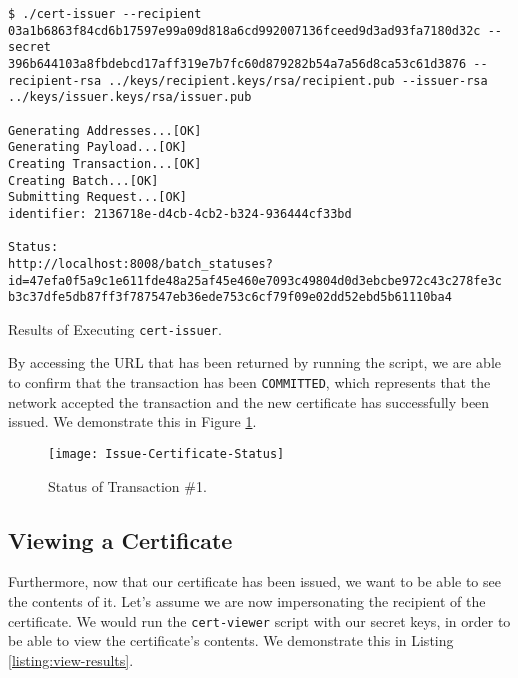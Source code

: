 \begin{listing}[ht]
	\begin{verbatim}
$ ./cert-issuer --recipient 03a1b6863f84cd6b17597e99a09d818a6cd992007136fceed9d3ad93fa7180d32c --secret 396b644103a8fbdebcd17aff319e7b7fc60d879282b54a7a56d8ca53c61d3876 --recipient-rsa ../keys/recipient.keys/rsa/recipient.pub --issuer-rsa ../keys/issuer.keys/rsa/issuer.pub

Generating Addresses...[OK]
Generating Payload...[OK]
Creating Transaction...[OK]
Creating Batch...[OK]
Submitting Request...[OK]
identifier: 2136718e-d4cb-4cb2-b324-936444cf33bd

Status:
http://localhost:8008/batch_statuses?id=47efa0f5a9c1e611fde48a25af45e460e7093c49804d0d3ebcbe972c43c278fe3c
b3c37dfe5db87ff3f787547eb36ede753c6cf79f09e02dd52ebd5b61110ba4

\end{verbatim}
	\caption{Results of Executing \texttt{cert-issuer}.}
	\label{listing:issue-results}
\end{listing}

By accessing the URL that has been returned by running the script, we are able to confirm that the transaction has been \texttt{COMMITTED}, which represents that the network accepted the transaction and the new certificate has successfully been issued. We demonstrate this in Figure \ref{fig:issue-certificate-status}.

\begin{figure}[htb]
	\centering
	\texttt{[image: Issue-Certificate-Status]}
	\caption{Status of Transaction \#1.}
	\label{fig:issue-certificate-status}
\end{figure}

\subsection{Viewing a Certificate}
\label{sec:impl-view}

Furthermore, now that our certificate has been issued, we want to be able to see the contents of it. Let's assume we are now impersonating the recipient of the certificate. We would run the \texttt{cert-viewer} script with our secret keys, in order to be  able to view the certificate's contents. We demonstrate this in Listing \ref{listing:view-results}.

